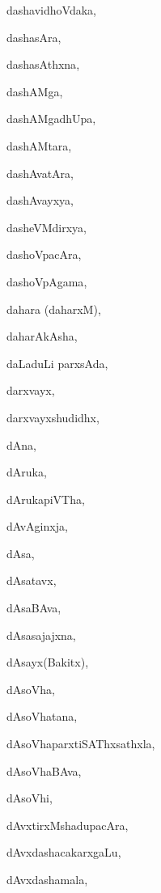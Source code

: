 \begin{multicols}{2}
{dashavidhoVdaka}, \pageref{dashavidhoVdaka}

{dashasAra}, \pageref{dashasAra}

{dashasAthxna}, \pageref{dashasAthxna}

{dashAMga}, \pageref{dashAMga}

{dashAMgadhUpa}, \pageref{dashAMgadhUpa}

{dashAMtara}, \pageref{dashAMtara}

{dashAvatAra}, \pageref{dashAvatAra}

{dashAvayxya}, \pageref{dashAvayxya}

{dasheVMdirxya}, \pageref{dasheVMdirxya}

{dashoVpacAra}, \pageref{dashoVpacAra}

{dashoVpAgama}, \pageref{dashoVpAgama}

{dahara (daharxM)}, \pageref{dahara daharxM}

{daharAkAsha}, \pageref{daharAkAsha}

{daLaduLi parxsAda}, \pageref{daLaduLi parxsAda}

{darxvayx}, \pageref{darxvayx}

{darxvayxshudidhx}, \pageref{darxvayxshudidhx}

{dAna}, \pageref{dAna}

{dAruka}, \pageref{dAruka}

{dArukapiVTha}, \pageref{dArukapiVTha}

{dAvAginxja}, \pageref{dAvAginxja}

{dAsa}, \pageref{dAsa}

{dAsatavx}, \pageref{dAsatavx}

{dAsaBAva}, \pageref{dAsaBAva}

{dAsasajajxna}, \pageref{dAsasajajxna}

{dAsayx(Bakitx)}, \pageref{dAsayxBakitx}

{dAsoVha}, \pageref{dAsoVha}

{dAsoVhatana}, \pageref{dAsoVhatana}

{dAsoVhaparxtiSAThxsathxla}, \pageref{dAsoVhaparxtiSAThxsathxla}

{dAsoVhaBAva}, \pageref{dAsoVhaBAva}

{dAsoVhi}, \pageref{dAsoVhi}

{dAvxtirxMshadupacAra}, \pageref{dAvxtirxMshadupacAra}

{dAvxdashacakarx\-gaLu}, \pageref{dAvxdashacakarxgaLu}

{dAvxdashamala}, \pageref{dAvxdashamala}


\end{multicols}
